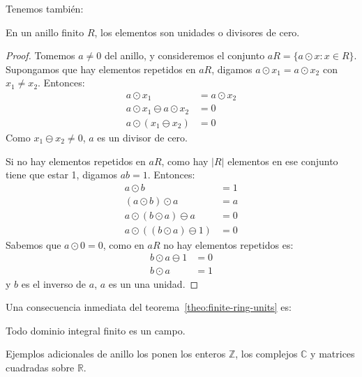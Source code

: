  Tenemos también:
  \begin{theorem}
    \label{theo:finite-ring-units}
    En un anillo finito \(R\),
    los elementos son unidades o divisores de cero.
  \end{theorem}
  \begin{proof}
    Tomemos \(a \ne 0\) del anillo,
    y consideremos el conjunto \(a R = \{a \odot x \colon x \in R\}\).
    Supongamos que hay elementos repetidos en \(a R\),
    digamos \(a \odot x_1 = a \odot x_2\) con \(x_1 \ne x_2\).
    Entonces:
    \begin{align*}
      a \odot x_1
	&= a \odot x_2 \\
      a \odot x_1 \ominus a \odot x_2
	&= 0 \\
      a \odot (x_1 \ominus x_2)
	&= 0
    \end{align*}
    Como \(x_1 \ominus x_2 \ne 0\),
    \(a\) es un divisor de cero.

    Si no hay elementos repetidos en \(a R\),
    como hay \(\lvert R \rvert\) elementos en ese conjunto
    tiene que estar 1,
    digamos \(a b = 1\).
    Entonces:
    \begin{align*}
      a \odot b
	&= 1 \\
      (a \odot b) \odot a
	&= a \\
      a \odot (b \odot a) \ominus a
	&= 0 \\
      a \odot ((b \odot a) \ominus 1)
	&= 0
    \end{align*}
    Sabemos que \(a \odot 0 = 0\),
    como en \(a R\) no hay elementos repetidos es:
    \begin{align*}
      b \odot a \ominus 1
	&= 0 \\
      b \odot a
	&= 1
    \end{align*}
    y \(b\) es el inverso de \(a\),
    \(a\) es un una unidad.
  \end{proof}
  Una consecuencia inmediata del teorema~\ref{theo:finite-ring-units}
  es:
  \begin{corollary}
    \label{cor:finite-ID=field}
    Todo dominio integral finito es un campo.
  \end{corollary}

  Ejemplos adicionales de anillo los ponen los enteros \(\mathbb{Z}\),%
  los complejos \(\mathbb{C}\)
  y matrices cuadradas sobre \(\mathbb{R}\).

